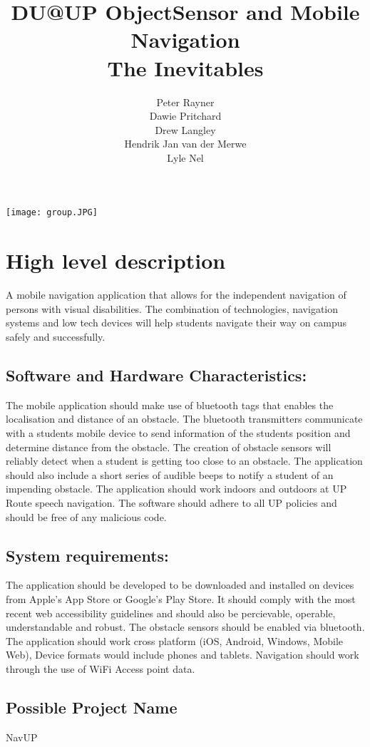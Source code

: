 \documentclass{article}
\title{DU@UP ObjectSensor and Mobile Navigation \\
The Inevitables
}
\author{  
            Peter Rayner\\
            Dawie Pritchard\\
            Drew Langley\\
            Hendrik Jan van der Merwe\\
            Lyle Nel\\
        }
\begin{document}
\maketitle

\texttt{[image: group.JPG]}

\newpage

\tableofcontents

\newpage


\section{High level description}
A mobile navigation application that allows for the independent navigation of persons with visual disabilities. The combination of technologies, navigation systems and low tech devices will help students navigate their way on campus safely and successfully. 

\subsection{Software and Hardware Characteristics:}
The mobile application should make use of bluetooth tags that enables the localisation and distance of an obstacle. The bluetooth transmitters communicate with a students mobile device to send information of the students position and determine distance from the obstacle. The creation of obstacle sensors will reliably detect when a student is getting too close to an obstacle. The application should also include a short series of audible beeps to notify a student of an impending obstacle. The application should work indoors and outdoors at UP Route speech navigation. The software should adhere to all UP policies and should be free of any malicious code.

\subsection{System requirements:}
The application should be developed to be downloaded and installed on devices from Apple's App Store or Google's Play Store.
It should comply with the most recent web accessibility guidelines and should also be percievable, operable, understandable and robust.
The obstacle sensors should be enabled via bluetooth.
The application should work cross platform (iOS, Android, Windows, Mobile Web), Device formats would include phones and tablets. Navigation should work through the use of WiFi Access point data.

\subsection{Possible Project Name}
NavUP
\end{document}
